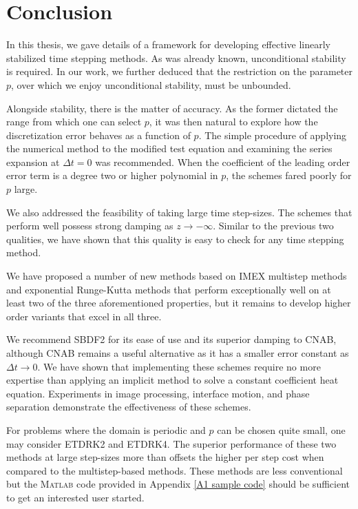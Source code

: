 \chapter{Conclusion}
In this thesis, we gave details of a framework for developing effective linearly stabilized time stepping methods. As was already known, unconditional stability is required. In our work, we further deduced that the restriction on the parameter $p$, over which we enjoy unconditional stability, must be unbounded. 

Alongside stability, there is the matter of accuracy. As the former dictated the range from which one can select $p$, it was then natural to explore how the discretization error behaves as a function of $p$. The simple procedure of applying the numerical method to the modified test equation and examining the series expansion at $\Delta t = 0$ was recommended. When the coefficient of the leading order error term is a degree two or higher polynomial in $p$, the schemes fared poorly for $p$ large.

We also addressed the feasibility of taking large time step-sizes. The schemes that perform well possess strong damping as $z\to-\infty$. Similar to the previous two qualities, we have shown that this quality is easy to check for any time stepping method.

We have proposed a number of new methods based on IMEX multistep methods and exponential Runge-Kutta methods that perform exceptionally well on at least two of the three aforementioned properties, but it remains to develop higher order variants that excel in all three.

We recommend SBDF2 for its ease of use and its superior damping to CNAB, although CNAB remains a useful alternative as it has a smaller error constant as $\Delta t \to 0$. We have shown that implementing these schemes require no more expertise than applying an implicit method to solve a constant coefficient heat equation. Experiments in image processing, interface motion, and phase separation demonstrate the effectiveness of these schemes.

For problems where the domain is periodic and $p$ can be chosen quite small, one may consider ETDRK2 and ETDRK4. The superior performance of these two methods at large step-sizes more than offsets the higher per step cost when compared to the multistep-based methods. These methods are less conventional but the \textsc{Matlab} code provided in Appendix \ref{A1 sample code} should be sufficient to get an interested user started.


